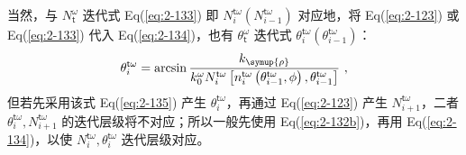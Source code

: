 当然，与 $N^{\omega}_{\mathsf{t}}$ 迭代式 Eq(\ref{eq:2-133}) 即 $N^{\mathsf{t}\omega}_{i} \left( N^{\mathsf{t}\omega}_{i-1} \right)$ 对应地，将 Eq(\ref{eq:2-123}) 或 Eq(\ref{eq:2-133}) 代入 Eq(\ref{eq:2-134})，也有 $\theta^{\omega}_{\mathsf{t}}$ 迭代式 $\theta^{\mathsf{t}\omega}_{i} \left( \theta^{\mathsf{t}\omega}_{i-1} \right)$：
\begin{equation} \label{eq:2-135}
	\theta^{\mathsf{t}\omega}_{i} = \arcsin \frac{ k_{\symup{\rho}} }{ k^{\omega}_{0} N^{\mathsf{t}\omega}_{i} \left[ n^{\mathsf{t}\omega}_{i} \left( \theta^{\mathsf{t}\omega}_{i-1}, \phi \right), \theta^{\mathsf{t}\omega}_{i-1} \right] } ~,
\end{equation}
但若先采用该式 Eq(\ref{eq:2-135}) 产生 $\theta^{\mathsf{t}\omega}_{i}$，再通过 Eq(\ref{eq:2-123}) 产生 $N^{\mathsf{t}\omega}_{i+1}$，二者 $\theta^{\mathsf{t}\omega}_{i}, N^{\mathsf{t}\omega}_{i+1}$ 的迭代层级将不对应；所以一般先使用 Eq(\ref{eq:2-132b})，再用 Eq(\ref{eq:2-134})，以使 $N^{\mathsf{t}\omega}_{i}, \theta^{\mathsf{t}\omega}_{i}$ 迭代层级对应。

